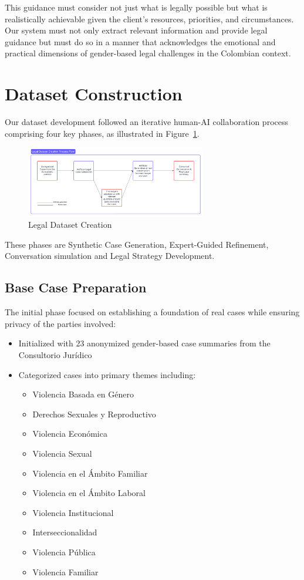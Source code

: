 This guidance must consider not just what is legally possible 
but what is realistically achievable given the client's resources, priorities, and circumstances. Our system must not only extract relevant information and provide legal guidance but must do so in a manner that acknowledges the emotional 
and practical dimensions of gender-based legal challenges in the Colombian context.

\section{Dataset Construction}
\label{sec:dataset}

Our dataset development followed an iterative human-AI collaboration process comprising four key phases, 
as illustrated in Figure~\ref{fig:legal_data}.

\begin{figure}[htbp]
    \centering
    \includegraphics[width=0.7\textwidth]{figures/Legal_dataset.png}
    \caption{Legal Dataset Creation}
    \label{fig:legal_data}
\end{figure}

These phases are Synthetic Case Generation, Expert-Guided Refinement, Conversation simulation and Legal Strategy Development.

\subsection{Base Case Preparation}
The initial phase focused on establishing a foundation of real cases while ensuring privacy of the parties involved:
\begin{itemize}
    \item Initialized with 23 anonymized gender-based case summaries from the Consultorio Jurídico
    \item Categorized cases into primary themes including:
    \begin{itemize}
        \item Violencia Basada en Género
        \item Derechos Sexuales y Reproductivo
        \item Violencia Económica
        \item Violencia Sexual
        \item Violencia en el Ámbito Familiar
        \item Violencia en el Ámbito Laboral
        \item Violencia Institucional
        \item Interseccionalidad
        \item Violencia Pública
        \item Violencia Familiar
    \end{itemize}
\end{itemize}

